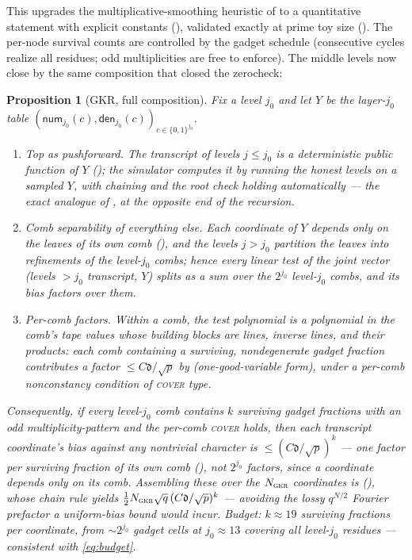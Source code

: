 \documentclass{article}
\newcommand{\extdeg}{\mathfrak{d}}
\newcommand{\num}{\mathsf{num}}
\newcommand{\den}{\mathsf{den}}
\newtheorem{proposition}[theorem]{Proposition}
\theoremstyle{definition}
\begin{document}
This upgrades the multiplicative-smoothing heuristic of  to a quantitative statement with explicit constants (), validated exactly at prime toy size (). The per-node survival counts are controlled by the gadget schedule (consecutive cycles realize all residues; odd multiplicities are free to enforce). The middle levels now close by the same composition that closed the zerocheck:

\begin{proposition}[GKR, full composition]\label{prop:gkr-full}
Fix a level $j_0$ and let $Y$ be the layer-$j_0$ table $(\num_{j_0}(c), \den_{j_0}(c))_{c \in \{0,1\}^{j_0}}$.
\begin{enumerate}
    \item \emph{Top as pushforward.} The transcript of levels $j \leq j_0$ is a deterministic public function of $Y$ (); the simulator computes it by running the honest levels on a sampled $Y$, with chaining and the root check holding automatically --- the exact analogue of , at the opposite end of the recursion.
    \item \emph{Comb separability of everything else.} Each coordinate of $Y$ depends only on the leaves of its own comb (), and the levels $j > j_0$ partition the leaves into \emph{refinements} of the level-$j_0$ combs; hence every linear test of the joint vector (levels $> j_0$ transcript, $Y$) splits as a sum over the $2^{j_0}$ level-$j_0$ combs, and its bias \emph{factors} over them.
    \item \emph{Per-comb factors.} Within a comb, the test polynomial is a polynomial in the comb's tape values whose building blocks are lines, inverse lines, and their products: each comb containing a surviving, nondegenerate gadget fraction contributes a factor $\leq C\extdeg/\sqrt p$ by  (one-good-variable form), under a per-comb nonconstancy condition of \textsc{cover} type.
\end{enumerate}
Consequently, if every level-$j_0$ comb contains $k$ surviving gadget fractions with an odd multiplicity-pattern and the per-comb \textsc{cover} holds, then each transcript coordinate's bias against any nontrivial character is $\leq (C\extdeg/\sqrt p)^{k}$ --- one factor per surviving fraction of its own comb (), \emph{not} $2^{j_0}$ factors, since a coordinate depends only on its comb. Assembling these over the $N_{\textsc{gkr}}$ coordinates is  (), whose chain rule yields $\tfrac12 N_{\textsc{gkr}}\sqrt q\,(C\extdeg/\sqrt p)^{k}$ --- avoiding the lossy $q^{N/2}$ Fourier prefactor a uniform-bias bound would incur. Budget: $k \approx 19$ surviving fractions per coordinate, from $\sim 2^{j_0}$ gadget cells at $j_0 \approx 13$ covering all level-$j_0$ residues --- consistent with \cref{eq:budget}.
\end{proposition}
\end{document}
